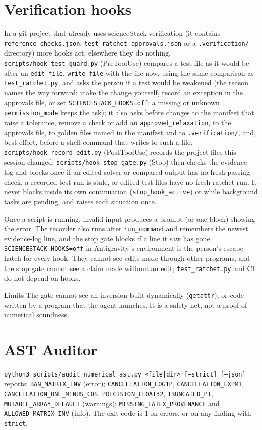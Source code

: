 \documentclass[11pt,a4paper]{report}
\begin{document}
\section{Verification hooks}
In a git project that already uses scienceStack verification (it contains \texttt{reference-checks.json}, \texttt{test-ratchet-approvals.json} or a \texttt{.verification/} directory) more hooks act; elsewhere they do nothing. \texttt{scripts/hook\_test\_guard.py} (PreToolUse) compares a test file as it would be after an \texttt{edit\_file}, \texttt{write\_file} with the file now, using the same comparison as \texttt{test\_ratchet.py}, and asks the person if a test would be weakened (the reason names the way forward: make the change yourself, record an exception in the approvals file, or set \texttt{SCIENCESTACK\_HOOKS=off}; a missing or unknown \texttt{permission\_mode} keeps the ask); it also asks before changes to the manifest that raise a tolerance, remove a check or add an \texttt{approved\_relaxation}, to the approvals file, to golden files named in the manifest and to \texttt{.verification/}, and, best effort, before a shell command that writes to such a file. \texttt{scripts/hook\_record\_edit.py} (PostToolUse) records the project files this session changed; \texttt{scripts/hook\_stop\_gate.py} (Stop) then checks the evidence log and blocks once if an edited solver or compared output has no fresh passing check, a recorded test run is stale, or edited test files have no fresh ratchet run. It never blocks inside its own continuation (\texttt{stop\_hook\_active}) or while background tasks are pending, and raises each situation once.

Once a script is running, invalid input produces a prompt (or one block) showing the error. The recorder also runs after \texttt{run\_command} and remembers the newest evidence-log line, and the stop gate blocks if a line it saw has gone. \texttt{SCIENCESTACK\_HOOKS=off} in Antigravity's environment is the person's escape hatch for every hook. They cannot see edits made through other programs, and the stop gate cannot see a claim made without an edit; \texttt{test\_ratchet.py} and CI do not depend on hooks.

\begin{warningbox}{Limits}
The gate cannot see an inversion built dynamically (\texttt{getattr}), or code written by a program that the agent launches. It is a safety net, not a proof of numerical soundness.
\end{warningbox}

\section{AST Auditor}
\texttt{python3 scripts/audit\_numerical\_ast.py <file|dir> [--strict] [--json]} reports:
\texttt{BAN\_MATRIX\_INV} (error); \texttt{CANCELLATION\_LOG1P}, \texttt{CANCELLATION\_EXPM1}, \texttt{CANCELLATION\_ONE\_MINUS\_COS}, \texttt{PRECISION\_FLOAT32}, \texttt{TRUNCATED\_PI}, \texttt{MUTABLE\_ARRAY\_DEFAULT} (warnings); \texttt{MISSING\_LATEX\_PROVENANCE} and \texttt{ALLOWED\_MATRIX\_INV} (info). The exit code is 1 on errors, or on any finding with \texttt{--strict}.
\end{document}
